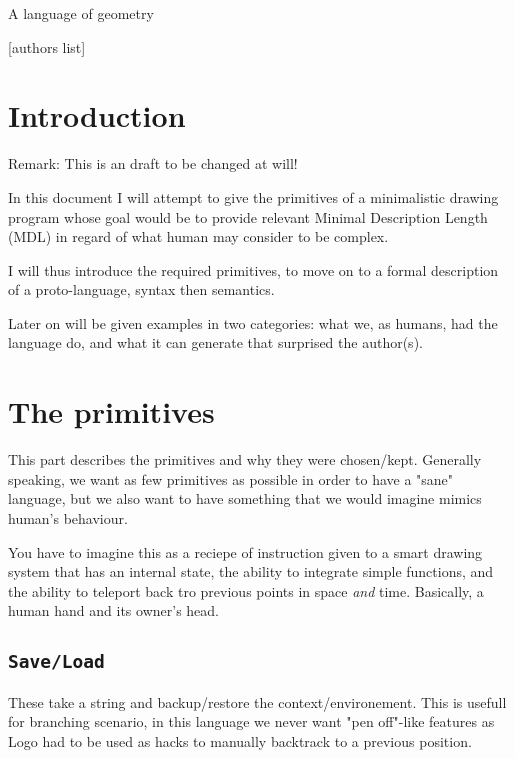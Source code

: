 \documentclass[hidelinks,10pt]{article}
\begin{document}
\begin{center}
    \large A language of geometry

    \normalsize [authors list]
\end{center}

\vspace{3\baselineskip}

\section{Introduction}

    Remark: This is an draft to be changed at will!

    In this document I will attempt to give the primitives of a minimalistic
    drawing program whose goal would be to provide relevant Minimal Description
    Length (MDL) in regard of what human may consider to be complex.

    I will thus introduce the required primitives, to move on to a formal
    description of a proto-language, syntax then semantics.

    Later on will be given examples in two categories: what we, as humans, had
    the language do, and what it can generate that surprised the author(s).

\section{The primitives}

    This part describes the primitives and why they were chosen/kept. Generally
    speaking, we want as few primitives as possible in order to have a "sane"
    language, but we also want to have something that we would imagine mimics
    human's behaviour.

    You have to imagine this as a reciepe of instruction given to a smart
    drawing system that has an internal state, the ability to integrate simple
    functions, and the ability to teleport back tro previous points in space
    \emph{and} time. Basically, a human hand and its owner's head.

    \subsection{\texttt{Save/Load}}

    These take a string and backup/restore the context/environement. This is
    usefull for branching scenario, in this language we never want "pen
    off"-like features as Logo had to be used as hacks to manually backtrack to
    a previous position.
\end{document}
